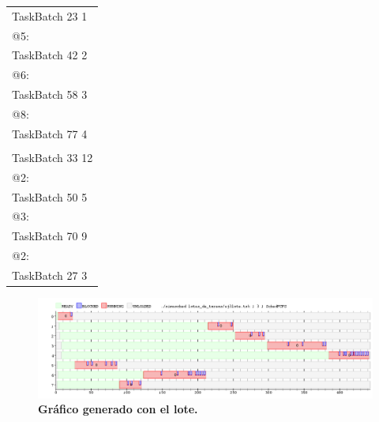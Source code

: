\begin{center}
	\begin{tabular}{|l|}
		\hline
		TaskBatch 23 1		\\
		@5: 				\\
		TaskBatch 42 2		\\
		@6:					\\
		TaskBatch 58 3		\\
		@8:					\\
		TaskBatch 77 4		\\
							\\
		TaskBatch 33 12		\\
		@2:					\\
		TaskBatch 50 5		\\
		@3:					\\
		TaskBatch 70 9		\\
		@2:					\\
		TaskBatch 27 3		\\
		\hline
	\end{tabular}
\end{center}

\begin{figure}[!h]
	\begin{center}
		\includegraphics[width=500px]{imagenes/ej3.png}
		\caption{\small{\textbf{Gráfico generado con el lote.}}}
		\label{fig:grafico_ej1}
	\end{center}
\end{figure}
